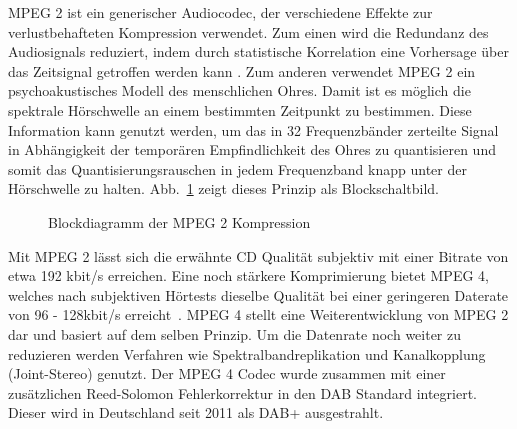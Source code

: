 \ac{MPEG 2} ist ein generischer Audiocodec, der verschiedene Effekte zur verlustbehafteten Kompression verwendet. Zum einen wird die Redundanz des Audiosignals reduziert, indem durch statistische Korrelation eine Vorhersage über das Zeitsignal getroffen werden kann \cite{dab_buch}. Zum anderen verwendet \ac{MPEG 2} ein psychoakustisches Modell des menschlichen Ohres. Damit ist es möglich die spektrale Hörschwelle an einem bestimmten Zeitpunkt zu bestimmen. Diese Information kann genutzt werden, um das in 32 Frequenzbänder zerteilte Signal in Abhängigkeit der temporären Empfindlichkeit des Ohres zu quantisieren und somit das Quantisierungsrauschen in jedem Frequenzband knapp unter der Hörschwelle zu halten. Abb.~\ref{chart:MPEG} zeigt dieses Prinzip als Blockschaltbild. 
\\
\begin{figure} [h]
\begin{center}
\caption{Blockdiagramm der MPEG 2 Kompression}
\label{chart:MPEG}
\end{center}
\end{figure}

Mit \ac{MPEG 2} lässt sich die erwähnte CD Qualität subjektiv mit einer Bitrate von etwa 192 kbit/s erreichen. Eine noch stärkere Komprimierung bietet \ac{MPEG 4}, welches nach subjektiven Hörtests dieselbe Qualität bei einer geringeren Daterate von 96 - 128kbit/s erreicht~\cite{mpeg:audio_tests}. \ac{MPEG 4} stellt eine Weiterentwicklung von \ac{MPEG 2} dar und basiert auf dem selben Prinzip. Um die Datenrate noch weiter zu reduzieren werden Verfahren wie Spektralbandreplikation und Kanalkopplung (Joint-Stereo) genutzt. Der \ac{MPEG 4} Codec wurde zusammen mit einer zusätzlichen Reed-Solomon Fehlerkorrektur in den DAB Standard integriert. Dieser wird in Deutschland seit 2011 als DAB+ ausgestrahlt.

